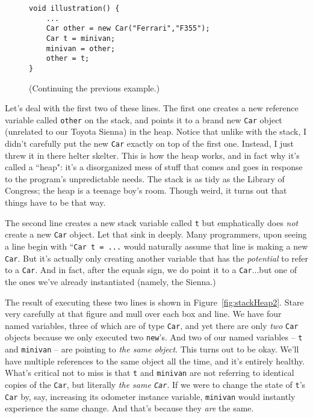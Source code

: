 \begin{figure}[ht]
\begin{Verbatim}[fontsize=\small,samepage=true,frame=single]
void illustration() {
    ...
    Car other = new Car("Ferrari","F355");
    Car t = minivan;
    minivan = other;
    other = t;
}
\end{Verbatim}
\vspace{-.3in}
\caption{(Continuing the previous example.)}
\label{fig:additionalCode}
\end{figure}

Let's deal with the first two of these lines. The first one creates a new
reference variable called \texttt{other} on the stack, and points it to a
brand new \texttt{Car} object (unrelated to our Toyota Sienna) in the heap.
Notice that unlike with the stack, I didn't carefully put the new \texttt{Car}
exactly on top of the first one. Instead, I just threw it in there helter
skelter. This is how the heap works, and in fact why it's called a ``heap":
it's a disorganized mess of stuff that comes and goes in response to the
program's unpredictable needs. The stack is as tidy as the Library of
Congress; the heap is a teenage boy's room. Though weird, it turns out that
things have to be that way.

The second line creates a new stack variable called \texttt{t} but
emphatically does \textit{not} create a new \texttt{Car} object. Let that sink
in deeply. Many programmers, upon seeing a line begin with ``\texttt{Car t =
...} would naturally assume that line is making a new \texttt{Car}. But it's
actually only creating another variable that has the \textit{potential} to
refer to a \texttt{Car}. And in fact, after the equals sign, we do point it to
a \texttt{Car}...but one of the ones we've already instantiated (namely, the
Sienna.)

The result of executing these two lines is shown in
Figure~\ref{fig:stackHeap2}. Stare very carefully at that figure and mull over
each box and line. We have four named variables, three of which are of type
\texttt{Car}, and yet there are only \textit{two} \texttt{Car} objects because
we only executed two \texttt{new}'s. And two of our named variables --
\texttt{t} and \texttt{minivan} -- are pointing to \textit{the same object}.
This turns out to be okay. We'll have multiple references to the same object
all the time, and it's entirely healthy. What's critical not to miss is that
\texttt{t} and \texttt{minivan} are not referring to identical copies of the
\texttt{Car}, but literally \textit{the same \texttt{Car}}. If we were to
change the state of \texttt{t}'s \texttt{Car} by, say, increasing its odometer
instance variable, \texttt{minivan} would instantly experience the same
change. And that's because they \textit{are} the same. 

